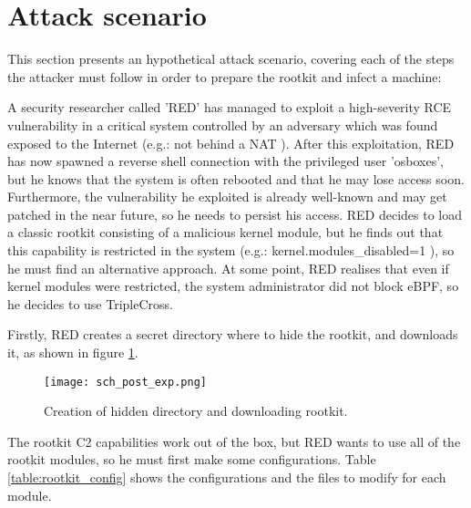 \section{Attack scenario} \label{section:attack_scenario}
This section presents an hypothetical attack scenario, covering each of the steps the attacker must follow in order to prepare the rootkit and infect a machine:

A security researcher called 'RED' has managed to exploit a high-severity RCE vulnerability in a critical system controlled by an adversary which was found exposed to the Internet (e.g.: not behind a NAT \cite{nat_comptia}). After this exploitation, RED has now spawned a reverse shell connection with the privileged user 'osboxes', but he knows that the system is often rebooted and that he may lose access soon. Furthermore, the vulnerability he exploited is already well-known and may get patched in the near future, so he needs to persist his access. RED decides to load a classic rootkit consisting of a malicious kernel module, but he finds out that this capability is restricted in the system (e.g.: kernel.modules\_disabled=1 \cite{kernel_modules_restrict}), so he must find an alternative approach. At some point, RED realises that even if kernel modules were restricted, the system administrator did not block eBPF, so he decides to use TripleCross.

Firstly, RED creates a secret directory where to hide the rootkit, and downloads it, as shown in figure \ref{fig:post_exp}.

\begin{figure}[htbp]
	\centering
	\texttt{[image: sch\_post\_exp.png]}
	\caption{Creation of hidden directory and downloading rootkit.}
	\label{fig:post_exp}
\end{figure}

The rootkit C2 capabilities work out of the box, but RED wants to use all of the rootkit modules, so he must first make some configurations. Table \ref{table:rootkit_config} shows the configurations and the files to modify for each module.

